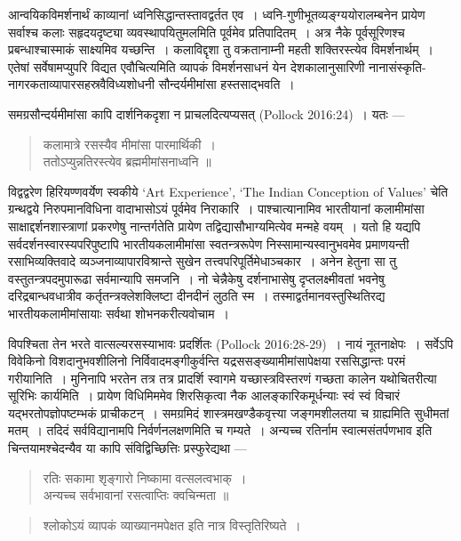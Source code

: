 {\dev आन्वयिकविमर्शनार्थं काव्यानां ध्वनिसिद्धान्तस्तावद्वर्तत एव~। ध्वनि-गुणीभूतव्यङ्ग्ययो\-रालम्ब\-नेन प्रायेण सर्वाश्च कलाः सहृदयदृष्ट्या व्यवस्थापयितुमलमिति पूर्वमेव प्रतिपादितम्~। अत्र नैके पूर्वसूरिणश्च प्रबन्धाश्चास्माकं साक्ष्यमिव यच्छन्ति~। कलाविद्दृशा तु वक्रतानाम्नी महती शक्तिरस्त्येव विमर्शनार्थम्~। एतेषां सर्वेषामप्युपरि विद्यत एवौचित्यमिति व्यापकं विमर्शन\-साधनं येन देशकालानुसारिणी नानासंस्कृति-नागरकताव्यापारसहस्रवैविध्यशोधनी सौन्दर्य\-मीमांसा हस्तसाद्भवति~।}

{\dev समग्रसौन्दर्यमीमांसा कापि दार्शनिकदृशा न प्राचलदित्यप्यसत्} (Pollock 2016:24){\dev~। यतः ---}
\begin{quote}
{\dev कलामात्रे रसस्यैव मीमांसा पारमार्थिकी~।}\\
{\dev ततोऽप्युन्नतिरस्त्येव ब्रह्ममीमांसनाध्वनि ॥}
\end{quote}

{\dev विद्वद्वरेण हिरियण्णवर्येण स्वकीये} `Art Experience', `The Indian Conception of Values' {\dev चेति ग्रन्थद्वये निरुपमानविधिना वादाभासोऽयं पूर्वमेव निराकारि~। पाश्चात्यानामिव भारतीयानां कलामीमांसा साक्षाद्दर्शनशास्त्राणां प्रकरणेषु नान्तर्गतेति प्रायेण तद्विद्यासौभाग्य\-मित्येव मन्महे वयम्~। यतो हि यद्यपि सर्वदर्शनस्वारस्यपरिपुष्टापि भारतीयकलामीमांसा स्वतन्त्ररूपेण निस्सामान्यस्वानुभवमेव  प्रमाणयन्ती रसाभिव्यक्तिवादे व्यञ्जनाव्यापारविश्रान्ते सुखेन तत्त्वपरिपूर्तिमेधाञ्चकार~। अनेन हेतुना सा तु वस्तुतन्त्रपदमुपारूढा सर्वमान्यापि सम\-जनि~। नो चेन्नैकेषु दर्शनाभासेषु दृप्तलक्ष्मीवतां भवनेषु दरिद्रबान्धवधात्रीव कर्तृतन्त्रक्लेशक्लिष्टा दीनदीनं लुठति स्म~। तस्माद्वर्तमानवस्तुस्थितिरद्य भारतीयकलामीमांसायाः सर्वथा शोभन\-करीत्यवोचाम~।}

{\dev विपश्चिता तेन भरते वात्सल्यरसस्याभावः प्रदर्शितः} (Pollock 2016:28-29){\dev~। नायं नूतना\-क्षेपः~। सर्वेऽपि विवेकिनो विशदानुभवशीलिनो निर्विवादमङ्गीकुर्वन्ति यद्रससङ्ख्यामीमांसापेक्षया रससिद्धान्तः परमं गरीयानिति~। मुनिनापि भरतेन तत्र तत्र प्रादर्शि स्वागमे यच्छास्त्रविस्तरणं गच्छता कालेन यथोचितरीत्या सूरिभिः कार्यमिति~। प्रायेण विधिमिममेव शिरसिकृत्वा नैक आलङ्कारिकमूर्धन्याः स्वं स्वं विचारं यद्भरतोपज्ञोपष्टम्भकं प्राचीकटन्~। समग्रमिदं शास्त्र\-मखण्डैकवृत्त्या जङ्गमशीलतया च ग्राह्यमिति सुधीमतां मतम्~। तदिदं सर्वविद्यानामपि निर्व\-र्णनलक्षणमिति च गम्यते~। अन्यच्च रतिर्नाम स्वात्मसंतर्पणभाव इति चिन्तयामश्चेदन्यैव या कापि संविद्विच्छित्तिः प्रस्फुरेद्यथा ---}
\begin{quote}
{\dev रतिः सकामा शृङ्गारो निष्कामा वत्सलत्वभाक्~।}\\
{\dev अन्यच्च सर्वभावानां रसत्वाप्तिः क्वचिन्मता ॥}
\end{quote}
\begin{quote}
{\dev श्लोकोऽयं व्यापकं व्याख्यानमपेक्षत इति नात्र विस्तृतिरिष्यते~।}
\end{quote}

